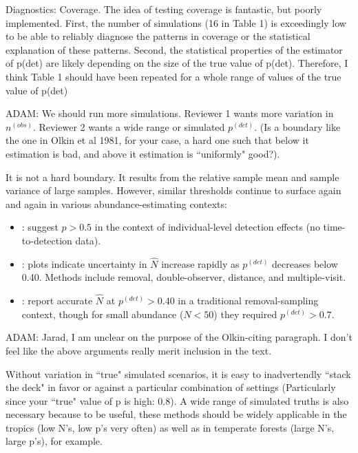 \documentclass[12pt]{article}
\renewenvironment{quote}  %
              {\list{}{\rightmargin\leftmargin}\normalfont%
               \item\relax}
              {\endlist}
\newcommand{\adam}[1]{{\color{blue} ADAM: #1}}
\newcommand{\pdet}{p^{(det)}}
\begin{document}
Diagnostics: Coverage. The idea of testing coverage is fantastic, but poorly implemented. First, the number of simulations (16 in Table 1) is exceedingly low to be able to reliably diagnose the patterns in coverage or the statistical explanation of these patterns. Second, the statistical properties of the estimator of p(det) are likely depending on the size of the true value of p(det). Therefore, I think Table 1 should have been repeated for a whole range of values of the true value of p(det)
\begin{quote}
\adam{We should run more simulations.  Reviewer 1 wants more variation in $n^{(obs)}$.  Reviewer 2 wants a wide range or simulated $\pdet$.}
\end{quote}
(Is a boundary like the one in Olkin et al 1981, for your case, a hard one such that below it estimation is bad, and above it estimation is ``uniformly" good?).
\begin{quote}
It is not a hard boundary.  It results from the relative sample mean and sample variance of large samples.
However, similar thresholds continue to surface again and again in various abundance-estimating contexts: 
\begin{itemize}
\item \citet{Veech2016}: suggest  $p>0.5$ in the context of individual-level detection effects (no time-to-detection data). 
\item \citet{Field2016}: plots indicate uncertainty in $\hat{N}$ increase rapidly as $\pdet$ decreases below 0.40.  Methods include removal, double-observer, distance, and multiple-visit.
\item \citet{Davis2016}: report accurate $\hat{N}$ at $\pdet >0.40$ in a traditional removal-sampling context, though for small abundance ($N<50$) they required $\pdet > 0.7$.
\end{itemize}
\adam{Jarad, I am unclear on the purpose of the Olkin-citing paragraph.  I don't feel like the above arguments really merit inclusion in the text.}
\end{quote}

 Without variation in ``true" simulated scenarios, it is easy to inadvertendly ``stack the deck" in favor or against a particular combination of settings (Particularly since your ``true" value of p is high: 0.8). A wide range of simulated truths is also necessary because to be useful, these methods should be widely applicable in the
tropics (low N's, low p's very often) as well as in temperate forests (large N's, large p's), for example.
\end{document}
